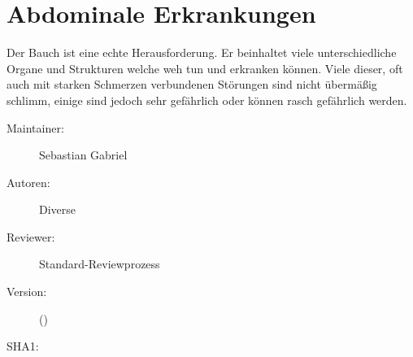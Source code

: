 \def\ChapterCode{ABD}
\chapter
[\CO{[ABD]} Abdominale Erkrankungen]
{Abdominale Erkrankungen}
\ChapterIntro
{%
Der Bauch ist eine echte Herausforderung. Er beinhaltet
viele unterschiedliche Organe und Strukturen welche weh tun
und erkranken können. Viele dieser, oft auch mit starken
Schmerzen verbundenen Störungen sind nicht übermäßig
schlimm, einige sind jedoch sehr gefährlich oder können
rasch gefährlich werden.


}
{%
\begin{description}
  \item[Maintainer:] Sebastian Gabriel
  \item[Autoren:] Diverse
  \item[Reviewer:] Standard-Reviewprozess
  \item[Version:] {\VarDocVersionTypeName} ({\VarDocVersionTypeDescription})
  \item[SHA1:] {\DocGitCommit}
\end{description}

{\TxTeilkapitelAASS}
}


\clearpage

\section{}

